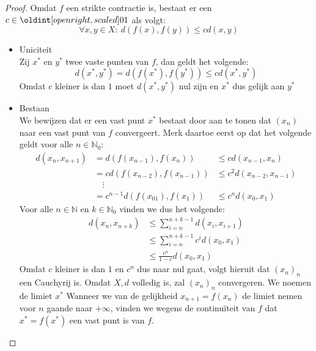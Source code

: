 \documentclass[main.tex]{subfiles}
\begin{document}
\begin{bst}
  \begin{proof}
    Omdat $f$ een strikte contractie is, bestaat er een $c\in\interval[open right]{0}{1}$ als volgt:
    \[ \forall x,y\in X:\ d\left(f(x),f(y)\right) \le cd(x,y) \]
    \begin{itemize}
    \item Uniciteit\\
      Zij $x^{*}$ en $y^{*}$ twee vaste punten van $f$, dan geldt het volgende:
      \[ d(x^{*},y^{*}) = d\left(f(x^{*}),f(y^{*})\right) \le cd(x^{*},y^{*}) \]
      Omdat $c$ kleiner is dan $1$ moet $d(x^{*},y^{*})$ nul zijn en $x^{*}$ dus gelijk aan $y^{*}$
    \item Bestaan\\
      We bewijzen dat er een vast punt $x^{*}$ bestaat door aan te tonen dat $(x_{n})$ naar een vast punt van $f$ convergeert.
      Merk daartoe eerst op dat het volgende geldt voor alle $n\in \mathbb{N}_{0}$:
      \begin{align*}
        d(x_{n},x_{n+1})
        &= d(f(x_{n-1}),f(x_{n}))
        &\le cd(x_{n-1},x_{n})\\
        &= cd(f(x_{n-2}),f(x_{n-1}))
        &\le c^{2}d(x_{n-2},x_{n-1})\\
        &\quad\vdots\\
        &= c^{n-1}d(f(x_{01}),f(x_{1})) &\le c^{n}d(x_{0},x_{1})
      \end{align*}
      Voor alle $n\in \mathbb{N}$ en $k\in \mathbb{N}_{0}$ vinden we dus het volgende:
      \begin{align*}
      d(x_{n},x_{n+k})
      &\le \sum_{i=n}^{n+k-1}d(x_{i},x_{i+1})\\
      &\le \sum_{i=n}^{n+k-1}c^{i}d(x_{0},x_{1})\\
      &\le \frac{c^{n}}{1-c} d(x_{0},x_{1})
      \end{align*}
      Omdat $c$ kleiner is dan $1$ en $c^{n}$ dus naar nul gaat, volgt hieruit dat $(x_{n})_{n}$ een Cauchyrij is.
      Omdat $X,d$ volledig is, zal $(x_{n})_{n}$ convergeren.
      We noemen de limiet $x^{*}$
      Wanneer we van de gelijkheid $x_{n+1}=f(x_{n})$ de limiet nemen voor $n$ gaande naar $+\infty$, vinden we wegens de continu\"iteit van $f$ dat $x^{*}=f(x^{*})$ een vast punt is van $f$.
    \end{itemize}
  \end{proof}
\end{bst}
\end{document}
